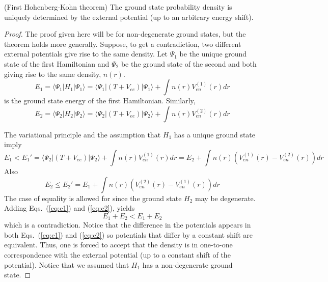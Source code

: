 \documentclass[11pt,oneside,final]{huthesis}%
\begin{document}
\begin{theorem} (First Hohenberg-Kohn theorem) The ground state probability density is uniquely determined by the external potential (up to an arbitrary energy shift). \end{theorem}
\begin{proof}
The proof given here will be for non-degenerate ground states, but the theorem holds more generally.  Suppose, to get a contradiction, two different external potentials give rise to the same density. Let $\Psi_1$ be the unique ground state of the first Hamiltonian and $\Psi_2$ be the ground state of the second and both giving rise to the same density, $n(r)$.   
\begin{equation}
E_1=\langle\Psi_1 |H_1| \Psi_1\rangle=\langle\Psi_1| (T+V_{ee})|\Psi_1\rangle+\int n(r)V_{en}^{(1)}(r)dr
\end{equation}
is the ground state energy of the first Hamiltonian. Similarly, 
\begin{equation}
E_2= \langle\Psi_2 |H_2 |\Psi_2\rangle=\langle\Psi_2| (T+V_{ee})|\Psi_2\rangle+\int n(r)V_{en}^{(2)}(r)dr
\end{equation}  

The variational principle and the assumption that $H_1$ has a unique ground state imply 
\begin{equation}
E_1<E_1'=\langle\Psi_2| (T+V_{ee})|\Psi_2\rangle+\int n(r)V_{en}^{(1)}(r)dr=E_2+\int  n(r) (V_{en}^{(1)}(r)-V_{en}^{(2)}(r))dr
\label{eq:e1}
\end{equation}
Also
\begin{equation}
E_2\leq E_2'=E_1+\int n(r)(V_{en}^{(2)}(r)-V_{en}^{(1)}(r))dr
\label{eq:e2}
\end{equation}
The case of equality is allowed for since the ground state $H_2$ may be degenerate. Adding Eqs.~(\ref{eq:e1}) and (\ref{eq:e2}), yields
\begin{equation*}
E_1+E_2<E_1+E_2
\end{equation*}
which is a contradiction.  Notice that the difference in the potentials appears in both Eqs.~(\ref{eq:e1}) and (\ref{eq:e2}) so potentials that differ by a constant shift are equivalent.  Thus, one is forced to accept that the density is in one-to-one correspondence with the external potential (up to a constant shift of the potential).  Notice that we assumed that $H_1$ has a non-degenerate ground state.
\end{proof}
\end{document}
